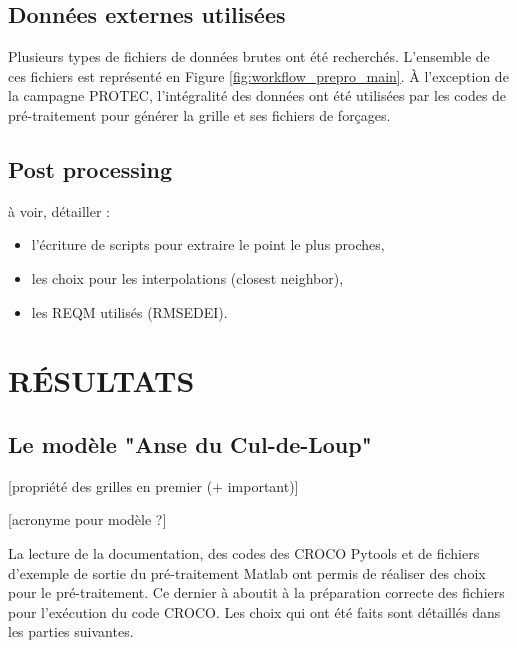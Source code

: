 \documentclass[10pt,a4paper,titlepage]{article}
\begin{document}
\subsection{Données externes utilisées}
\label{sub:donnees_externes}
Plusieurs types de fichiers de données brutes ont été recherchés. L'ensemble de ces fichiers est représenté en Figure \ref{fig:workflow_prepro_main}.
À l'exception de la campagne PROTEC, l'intégralité des données ont été utilisées par les codes de pré-traitement pour générer la grille et ses fichiers de forçages.



\subsection{Post processing}
\label{sub:postpro}
à voir, détailler :
\begin{itemize}
    \item l'écriture de scripts pour extraire le point le plus proches,
    \item les choix pour les interpolations (closest neighbor),
    \item les REQM utilisés (RMSEDEI).
\end{itemize}


\newpage
\section{RÉSULTATS}
\label{sec:resultats}


\subsection{Le modèle "Anse du Cul-de-Loup"}
\label{sub:modele_ADCL}

[propriété des grilles en premier (+ important)]

[acronyme pour modèle ?]


La lecture de la documentation, des codes des CROCO Pytools et de fichiers d'exemple de sortie du pré-traitement Matlab ont permis de réaliser des choix pour le pré-traitement.
Ce dernier à aboutit à la préparation correcte des fichiers pour l'exécution du code CROCO.
Les choix qui ont été faits sont détaillés dans les parties suivantes.
\end{document}
